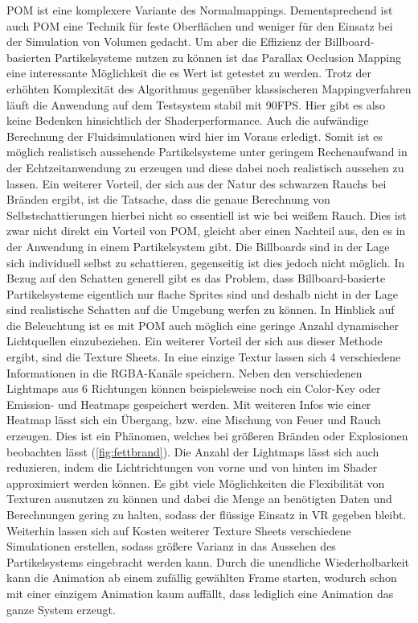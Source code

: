 POM ist eine komplexere Variante des Normalmappings. Dementsprechend ist auch POM eine Technik für feste Oberflächen und weniger
für den Einsatz bei der Simulation von Volumen gedacht. Um aber die Effizienz der Billboard-basierten Partikelsysteme 
nutzen zu können ist das Parallax Occlusion Mapping eine interessante Möglichkeit die es Wert ist getestet zu werden. 
Trotz der erhöhten Komplexität des Algorithmus gegenüber klassischeren Mappingverfahren läuft die Anwendung auf dem Testsystem 
stabil mit 90FPS. Hier gibt es also keine Bedenken hinsichtlich der Shaderperformance. Auch die aufwändige Berechnung der 
Fluidsimulationen wird hier im Voraus erledigt. Somit ist es möglich realistisch aussehende Partikelsysteme unter geringem 
Rechenaufwand in der Echtzeitanwendung zu erzeugen und diese dabei noch realistisch aussehen zu lassen. 
Ein weiterer Vorteil, der sich aus der Natur des schwarzen Rauchs bei Bränden ergibt, ist die Tatsache, dass die genaue Berechnung
von Selbstschattierungen hierbei nicht so essentiell ist wie bei weißem Rauch. 
Dies ist zwar nicht direkt ein Vorteil von POM, gleicht aber einen Nachteil aus, den es in der Anwendung in einem Partikelsystem gibt. 
Die Billboards sind in der Lage sich individuell selbst zu schattieren, gegenseitig ist dies jedoch nicht möglich. In Bezug auf den Schatten generell 
gibt es das Problem, dass Billboard-basierte Partikelsysteme eigentlich nur flache Sprites sind und deshalb nicht in der Lage sind realistische Schatten
auf die Umgebung werfen zu können. In Hinblick auf die Beleuchtung ist es mit POM auch möglich eine geringe Anzahl dynamischer Lichtquellen einzubeziehen. 
Ein weiterer Vorteil der sich aus dieser Methode ergibt, sind die Texture Sheets. In eine einzige Textur lassen sich 4 verschiedene Informationen in die 
RGBA-Kanäle speichern. Neben den verschiedenen Lightmaps aus 6 Richtungen können beispielsweise noch ein Color-Key oder Emission- und Heatmaps gespeichert werden.
Mit weiteren Infos wie einer Heatmap lässt sich ein Übergang, bzw. eine Mischung von Feuer und Rauch erzeugen. Dies ist ein Phänomen, welches bei größeren Bränden
oder Explosionen beobachten lässt (\autoref{fig:fettbrand}). 
Die Anzahl der Lightmaps lässt sich auch reduzieren, indem die Lichtrichtungen von vorne und von hinten im Shader approximiert werden können. 
Es gibt viele Möglichkeiten die Flexibilität von Texturen ausnutzen zu können und dabei die Menge an benötigten Daten und Berechnungen gering zu halten, 
sodass der flüssige Einsatz in VR gegeben bleibt. Weiterhin lassen sich auf Kosten weiterer Texture Sheets 
verschiedene Simulationen erstellen, sodass größere Varianz in das Aussehen des Partikelsystems eingebracht werden kann.
Durch die unendliche Wiederholbarkeit kann die Animation ab einem zufällig gewählten Frame starten, wodurch schon mit einer einzigem Animation
kaum auffällt, dass lediglich eine Animation das ganze System erzeugt. 

